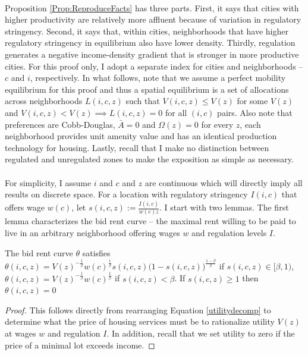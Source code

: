 \documentclass[12pt]{article}
\begin{document}
	\paragraph*{}
	Proposition \ref{Prop:ReproduceFacts} has three parts. First, it says that cities with higher productivity are relatively more affluent because of variation in regulatory stringency. Second, it says that, within cities, neighborhoods that have higher regulatory stringency in equilibrium also have lower density. Thirdly, regulation generates a negative income-density gradient that is stronger in more productive cities. For this proof only, I adopt a separate index for cities and neighborhoods -- $c$ and $i$, respectively. In what follows, note that we assume a perfect mobility equilibrium for this proof and thus a spatial equilibrium is a set of allocations across neighborhoods $L(i, c, z)$ such that $V(i, c, z) \leq V(z)$ for some $V(z)$ and $V(i, c, z) < V(z) \implies L(i, c, z) = 0$ for all $(i, c)$ pairs. Also note that preferences are Cobb-Douglas, $\bar{A} = 0$ and $\Omega(z) = 0$ for every $z$, each neighborhood provides unit amenity value and has an identical production technology for housing. Lastly, recall that I make no distinction between regulated and unregulated zones to make the exposition as simple as necessary. 
	
	\paragraph*{}
	For simplicity, I assume $i$ and $c$ and $z$ are continuous which will directly imply all results on discrete space. For a location with regulatory stringency $I(i, c)$ that offers wage $w(c)$, let $s(i, c, z) := \frac{I(i, c)}{w(c)z}$. I start with two lemmas. The first lemma characterizes the bid rent curve -- the maximal rent willing to be paid to live in an arbitrary neighborhood offering wages $w$ and regulation levels $I$. 
	
	\begin{Lemma}
		The bid rent curve $\theta$ satisfies 
		$\theta(i, c, z) = V(z)^{-\frac{1}{\beta}}w(c)^{\frac{1}{\beta}}s(i, c, z)\big(1-s(i, c, z)\big)^{\frac{1 - \beta}{\beta}} $ if $s(i, c, z) \in [\beta, 1)$, $\theta(i, c, z) = V(z)^{-\frac{1}{\beta}}w(c)^{\frac{1}{\beta}}$ if $s(i, c, z) < \beta$. If $s(i, c, z) \geq 1$ then $\theta(i, c, z) = 0$
	\end{Lemma}
	\begin{proof}
		This follows directly from rearranging Equation \eqref{utilitydecomp} to determine what the price of housing services must be to rationalize utility $V(z)$ at wages $w$ and regulation $I$. In addition, recall that we set utility to zero if the price of a minimal lot exceeds income.  
	\end{proof}
	
\end{document}
